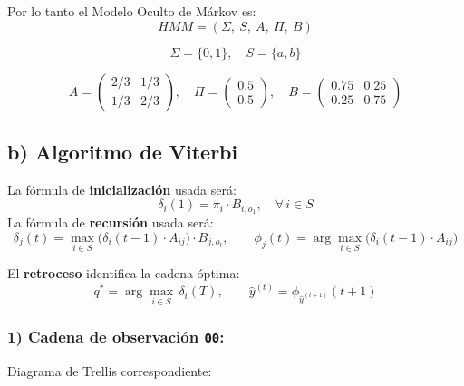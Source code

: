 \bigskip

Por lo tanto el Modelo Oculto de Márkov es:
\[
HMM = (\Sigma,\ S,\ A,\ \Pi,\ B)
\]

\[
\Sigma = \{0, 1\}, \quad S = \{a, b\}
\]

\[
A = \begin{pmatrix} 2/3 & 1/3 \\ 1/3 & 2/3 \end{pmatrix},
\quad
\Pi = \begin{pmatrix} 0.5 \\ 0.5 \end{pmatrix},
\quad
B = \begin{pmatrix} 0.75 & 0.25 \\ 0.25 & 0.75 \end{pmatrix}
\]


\subsection*{b) Algoritmo de Viterbi}

La fórmula de \textbf{inicialización} usada será:
\[
\delta_i(1) = \pi_i \cdot B_{i,o_1}, \quad \forall\, i \in S
\]
La fórmula de \textbf{recursión} usada será:
\[
\delta_j(t) = \max_{i \in S}\bigl(\delta_i(t-1)\cdot A_{ij}\bigr)\cdot B_{j,o_t},
\qquad
\phi_j(t) = \arg\max_{i \in S}\bigl(\delta_i(t-1)\cdot A_{ij}\bigr)
\]

El \textbf{retroceso} identifica la cadena óptima:
\[
q^* = \arg\max_{i \in S}\,\delta_i(T), \qquad
\hat{y}^{(t)} = \phi_{\hat{y}^{(t+1)}}(t+1)
\]

\subsubsection*{1) Cadena de observación \texttt{00}:}

Diagrama de Trellis correspondiente:
\begin{center}
\end{center}

